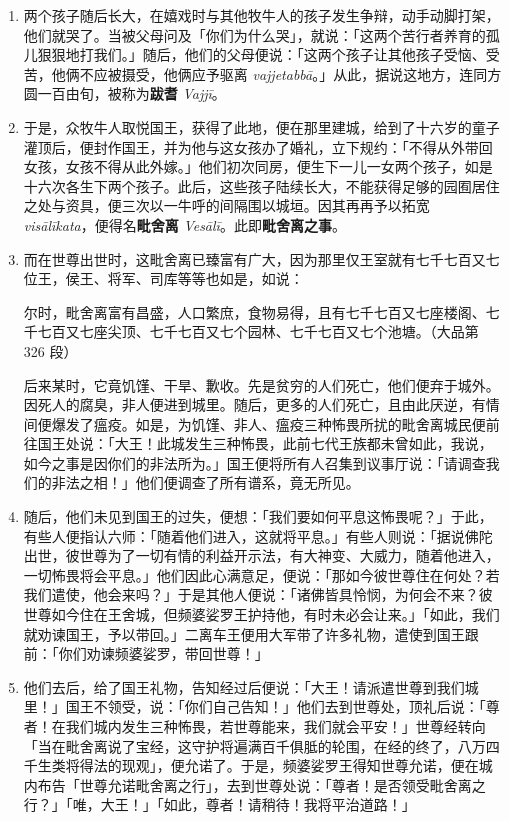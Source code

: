 \begin{enumerate}
\item 两个孩子随后长大，在嬉戏时与其他牧牛人的孩子发生争辩，动手动脚打架，他们就哭了。当被父母问及「你们为什么哭」，就说：「这两个苦行者养育的孤儿狠狠地打我们。」随后，他们的父母便说：「这两个孩子让其他孩子受恼、受苦，他俩不应被摄受，他俩应予驱离 \textit{vajjetabbā}。」从此，据说这地方，连同方圆一百由旬，被称为\textbf{跋耆} \textit{Vajjī}。
\item 于是，众牧牛人取悦国王，获得了此地，便在那里建城，给到了十六岁的童子灌顶后，便封作国王，并为他与这女孩办了婚礼，立下规约：「不得从外带回女孩，女孩不得从此外嫁。」他们初次同房，便生下一儿一女两个孩子，如是十六次各生下两个孩子。此后，这些孩子陆续长大，不能获得足够的园囿居住之处与资具，便三次以一牛呼的间隔围以城垣。因其再再予以拓宽 \textit{visālīkata}，便得名\textbf{毗舍离} \textit{Vesālī}。此即\textbf{毗舍离之事}。
\item 而在世尊出世时，这毗舍离已臻富有广大，因为那里仅王室就有七千七百又七位王，侯王、将军、司库等等也如是，如说：\begin{quoting}尔时，毗舍离富有昌盛，人口繁庶，食物易得，且有七千七百又七座楼阁、七千七百又七座尖顶、七千七百又七个园林、七千七百又七个池塘。（大品第 326 段）\end{quoting}后来某时，它竟饥馑、干旱、歉收。先是贫穷的人们死亡，他们便弃于城外。因死人的腐臭，非人便进到城里。随后，更多的人们死亡，且由此厌逆，有情间便爆发了瘟疫。如是，为饥馑、非人、瘟疫三种怖畏所扰的毗舍离城民便前往国王处说：「大王！此城发生三种怖畏，此前七代王族都未曾如此，我说，如今之事是因你们的非法所为。」国王便将所有人召集到议事厅说：「请调查我们的非法之相！」他们便调查了所有谱系，竟无所见。
\item 随后，他们未见到国王的过失，便想：「我们要如何平息这怖畏呢？」于此，有些人便指认六师：「随着他们进入，这就将平息。」有些人则说：「据说佛陀出世，彼世尊为了一切有情的利益开示法，有大神变、大威力，随着他进入，一切怖畏将会平息。」他们因此心满意足，便说：「那如今彼世尊住在何处？若我们遣使，他会来吗？」于是其他人便说：「诸佛皆具怜悯，为何会不来？彼世尊如今住在王舍城，但频婆娑罗王护持他，有时未必会让来。」「如此，我们就劝谏国王，予以带回。」二离车王便用大军带了许多礼物，遣使到国王跟前：「你们劝谏频婆娑罗，带回世尊！」
\item 他们去后，给了国王礼物，告知经过后便说：「大王！请派遣世尊到我们城里！」国王不领受，说：「你们自己告知！」他们去到世尊处，顶礼后说：「尊者！在我们城内发生三种怖畏，若世尊能来，我们就会平安！」世尊经转向「当在毗舍离说了宝经，这守护将遍满百千俱胝的轮围，在经的终了，八万四千生类将得法的现观」，便允诺了。于是，频婆娑罗王得知世尊允诺，便在城内布告「世尊允诺毗舍离之行」，去到世尊处说：「尊者！是否领受毗舍离之行？」「唯，大王！」「如此，尊者！请稍待！我将平治道路！」

\end{enumerate}
